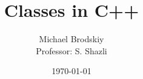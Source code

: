 


\def\code#1{\texttt{#1}}

\pagestyle{fancy}

\title{Classes in C++}
\date{\today}
\author{Michael Brodskiy\\ \small Professor: S. Shazli}



\maketitle

\thispagestyle{fancy}

\newpage

